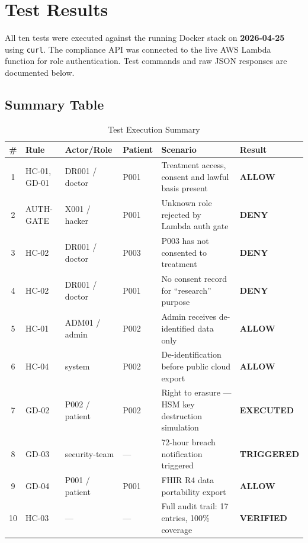 \documentclass[12pt,a4paper]{article}
\begin{document}
\section{Test Results}

All ten tests were executed against the running Docker stack on
\textbf{2026-04-25} using \texttt{curl}. The compliance API was connected to
the live AWS Lambda function for role authentication. Test commands and raw
JSON responses are documented below.

\subsection*{Summary Table}

\begin{table}[H]
\centering
\caption{Test Execution Summary}
\begin{tabularx}{\textwidth}{@{}clllXl@{}}
\toprule
\textbf{\#} & \textbf{Rule} & \textbf{Actor/Role} & \textbf{Patient} & \textbf{Scenario} & \textbf{Result} \\
\midrule
1  & HC-01, GD-01 & DR001 / doctor  & P001 & Treatment access, consent and lawful basis present    & \textcolor{allowgreen}{\textbf{ALLOW}} \\
2  & AUTH-GATE    & X001 / hacker   & P001 & Unknown role rejected by Lambda auth gate             & \textcolor{denygray}{\textbf{DENY}}  \\
3  & HC-02        & DR001 / doctor  & P003 & P003 has not consented to treatment                   & \textcolor{denygray}{\textbf{DENY}}  \\
4  & HC-02        & DR001 / doctor  & P001 & No consent record for ``research'' purpose            & \textcolor{denygray}{\textbf{DENY}}  \\
5  & HC-01        & ADM01 / admin   & P002 & Admin receives de-identified data only                & \textcolor{allowgreen}{\textbf{ALLOW}} \\
6  & HC-04        & system          & P002 & De-identification before public cloud export          & \textcolor{allowgreen}{\textbf{ALLOW}} \\
7  & GD-02        & P002 / patient  & P002 & Right to erasure --- HSM key destruction simulation   & \textbf{EXECUTED} \\
8  & GD-03        & security-team   & ---  & 72-hour breach notification triggered                 & \textbf{TRIGGERED} \\
9  & GD-04        & P001 / patient  & P001 & FHIR R4 data portability export                       & \textcolor{allowgreen}{\textbf{ALLOW}} \\
10 & HC-03        & ---             & ---  & Full audit trail: 17 entries, 100\% coverage          & \textbf{VERIFIED} \\
\bottomrule
\end{tabularx}
\end{table}
\end{document}
